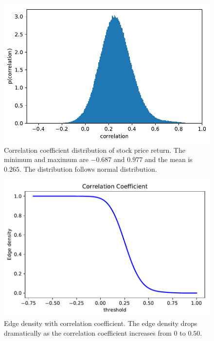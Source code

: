 \begin{figure}
	\begin{center}
		\includegraphics[width=14cm]{correlation_distribution}
	\end{center}
	\caption{Correlation coefficient distribution of stock price return. The minimum and maximum are $-0.687$ and $0.977$ and the mean is $0.265$. The distribution follows normal distribution.}
	\label{fig:correlation_distribution}  
\end{figure}

\begin{figure}
	\begin{center}
		\includegraphics[width=14cm]{correlation_edge_density}
	\end{center}
	\caption[Edge density with correlation coefficient]{Edge density with correlation coefficient. The edge density drops dramatically as the correlation coefficient increases from $0$ to $0.50$.}
	\label{fig:correlation_edge_density}  
\end{figure}

